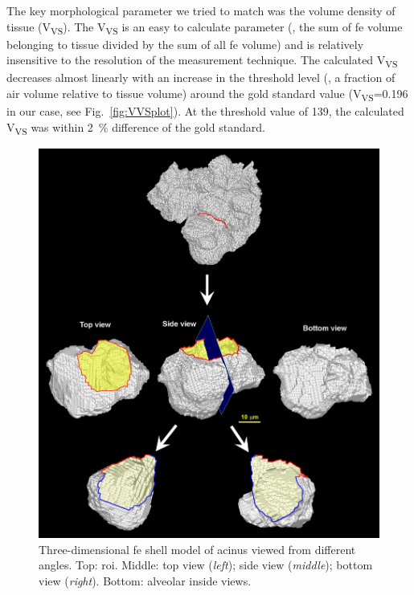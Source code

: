 The key morphological parameter we tried to match was the volume density of tissue (V\textsubscript{VS}). The V\textsubscript{VS} is an easy to calculate parameter (\ie, the sum of \ac{fe} volume belonging to tissue divided by the sum of all \ac{fe} volume) and is relatively insensitive to the resolution of the measurement technique. The calculated V\textsubscript{VS} decreases almost linearly with an increase in the threshold level (\ie, a fraction of air volume relative to tissue volume) around the gold standard value (V\textsubscript{VS}=0.196 in our case, see Fig.~\ref{fig:VVSplot}). At the threshold value of 139, the calculated V\textsubscript{VS} was within \SI{2}{\percent} difference of the gold standard.

\renewcommand{\imsize}{\linewidth}
\begin{figure}[ht]
	\centering
	\includegraphics[width=\imsize]{img/Tsuda2008/Tsuda-10}
	\caption[Three-dimensional FE shell model of a partial acinus]{Three-dimensional \ac{fe} shell model of acinus viewed from different angles. Top: \ac{roi}. Middle: top view (\textit{left}); side view (\textit{middle}); bottom view (\textit{right}). Bottom: alveolar inside views.}
	\label{fig:alveolus}
\end{figure}


